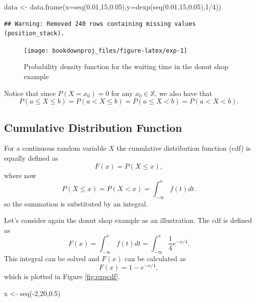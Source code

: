 \documentclass[
]{book}
\newenvironment{Shaded}{\begin{snugshade}}{\end{snugshade}}
\newcommand{\AttributeTok}[1]{\textcolor[rgb]{0.77,0.63,0.00}{#1}}
\newcommand{\DecValTok}[1]{\textcolor[rgb]{0.00,0.00,0.81}{#1}}
\newcommand{\FloatTok}[1]{\textcolor[rgb]{0.00,0.00,0.81}{#1}}
\newcommand{\FunctionTok}[1]{\textcolor[rgb]{0.00,0.00,0.00}{#1}}
\newcommand{\NormalTok}[1]{#1}
\newcommand{\OtherTok}[1]{\textcolor[rgb]{0.56,0.35,0.01}{#1}}
\newcommand{\SpecialCharTok}[1]{\textcolor[rgb]{0.00,0.00,0.00}{#1}}
\begin{document}
\begin{Shaded}
\begin{Highlighting}[]
\NormalTok{data }\OtherTok{\textless{}{-}} \FunctionTok{data.frame}\NormalTok{(}\AttributeTok{x=}\FunctionTok{seq}\NormalTok{(}\FloatTok{0.01}\NormalTok{,}\DecValTok{15}\NormalTok{,}\FloatTok{0.05}\NormalTok{),}\AttributeTok{y=}\FunctionTok{dexp}\NormalTok{(}\FunctionTok{seq}\NormalTok{(}\FloatTok{0.01}\NormalTok{,}\DecValTok{15}\NormalTok{,}\FloatTok{0.05}\NormalTok{),}\DecValTok{1}\SpecialCharTok{/}\DecValTok{4}\NormalTok{))}
\end{Highlighting}
\end{Shaded}

\begin{verbatim}
## Warning: Removed 240 rows containing missing values (position_stack).
\end{verbatim}

\begin{figure}

{\centering \texttt{[image: bookdownproj\_files/figure-latex/exp-1]} 

}

\caption{Probability density function for the waiting time in the donut shop example}\label{fig:exp}
\end{figure}

Notice that since \(P(X=x_0)=0\) for any \(x_0\in\mathbb{X}\), we also have that
\[
P(a\leq X \leq b)=P(a < X \leq b) = P(a\leq X < b) = P(a<X<b).
\]

\hypertarget{cumulative-distribution-function-1}{%
\subsection{Cumulative Distribution Function}\label{cumulative-distribution-function-1}}

For a continuous random variable \(X\) the cumulative distribution function (cdf) is equally defined as
\[
F(x) = P(X \leq x),
\]
where now
\[
P(X \leq x) = P(X < x) = \int_{-\infty}^xf(t)dt.
\]
so the summation is substituted by an integral.

Let's consider again the donut shop example as an illustration. The cdf is defined as
\[
F(x)=\int_{-\infty}^xf(t)dt = \int_{-\infty}^x\frac{1}{4}e^{-x/4}.
\]
This integral can be solved and \(F(x)\) can be calculated as
\[
F(x)= 1- e^{-x/4},
\]
which is plotted in Figure \ref{fig:expcdf}.

\begin{Shaded}
\begin{Highlighting}[]
\NormalTok{x }\OtherTok{\textless{}{-}} \FunctionTok{seq}\NormalTok{(}\SpecialCharTok{{-}}\DecValTok{2}\NormalTok{,}\DecValTok{20}\NormalTok{,}\FloatTok{0.5}\NormalTok{)}
\end{Highlighting}
\end{Shaded}
\end{document}
